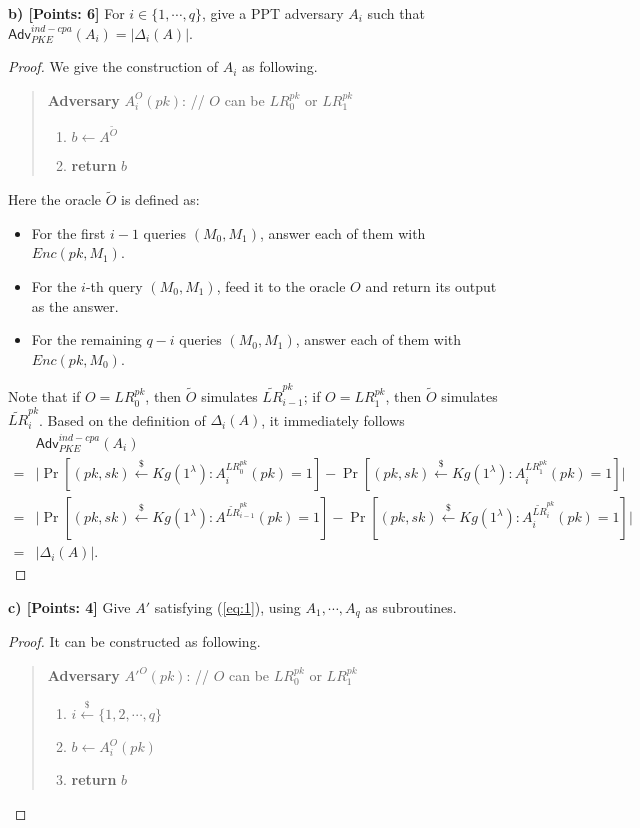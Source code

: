 \documentclass[12pt]{article}
\newcommand{\getsr}{\stackrel{\$}{\gets}}
\newcommand{\Adv}{\textsf{Adv}}
\theoremstyle{definition}
\begin{document}
{\bf b) [Points: 6]} For $i \in \{1, \cdots, q\}$, give a PPT adversary $A_i$ such that $\Adv_{PKE}^{ind-cpa}(A_i) = |\Delta_i(A)|$.
\begin{proof}
We give the construction of $A_i$ as following.
\begin{quote}
{\bf Adversary} $A_i^{O}(pk)$: // $O$ can be $LR_0^{pk}$ or $LR_1^{pk}$
\begin{enumerate}
\item $b \gets A^{\tilde{O}}$
\item {\bf return} $b$
\end{enumerate}
\end{quote}
Here the oracle $\tilde{O}$ is defined as:
\begin{itemize}
\item For the first $i-1$ queries $(M_0,M_1)$, answer each of them with $Enc(pk, M_1)$.
\item For the $i$-th query $(M_0,M_1)$, feed it to the oracle $O$ and return its output as the answer.
\item For the remaining $q-i$ queries $(M_0,M_1)$, answer each of them with $Enc(pk, M_0)$.
\end{itemize}
Note that if $O = LR_0^{pk}$, then $\tilde{O}$ simulates $\widetilde{LR}_{i-1}^{pk}$; if $O = LR_1^{pk}$, then $\tilde{O}$ simulates $\widetilde{LR}_{i}^{pk}$. Based on the definition of $\Delta_i(A)$, it immediately follows 
$$\begin{aligned}
& \Adv_{PKE}^{ind-cpa}(A_i) \\
=& \bigg| \Pr[(pk,sk) \getsr Kg(1^\lambda) : A_i^{LR_0^{pk}}(pk)=1] - \Pr[(pk,sk) \getsr Kg(1^\lambda) : A_i^{LR_1^{pk}}(pk)=1] \bigg| \\
=& \bigg| \Pr[(pk,sk) \getsr Kg(1^\lambda) : A^{\widetilde{LR}_{i-1}^{pk}}(pk)=1] - \Pr[(pk,sk) \getsr Kg(1^\lambda) : A_i^{\widetilde{LR}_{i}^{pk}}(pk)=1] \bigg| \\
=& |\Delta_i(A)|.
\end{aligned}$$
\end{proof}

{\bf c) [Points: 4]} Give $A'$ satisfying (\ref{eq:1}), using $A_1, \cdots, A_q$ as subroutines.
\begin{proof}
It can be constructed as following.
\begin{quote}
{\bf Adversary} $A'^O(pk)$: // $O$ can be $LR_0^{pk}$ or $LR_1^{pk}$
\begin{enumerate}
\item $i \getsr \{1, 2, \cdots, q\}$
\item $b \gets A_i^O(pk)$
\item {\bf return} $b$
\end{enumerate}
\end{quote}
\end{proof}
\end{document}

